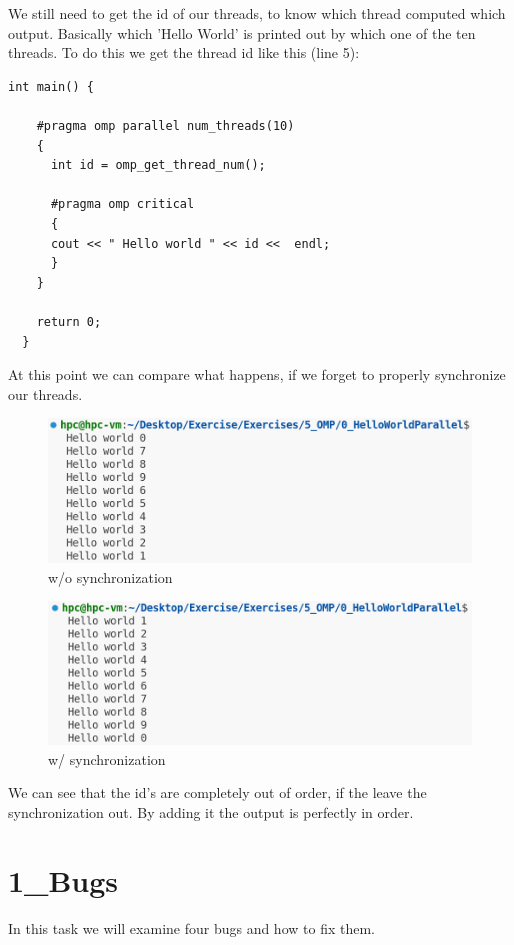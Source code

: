 \documentclass{article}
\begin{document}
We still need to get the id of our threads, to know which thread computed which output.
Basically which 'Hello World' is printed out by which one of the ten threads.
To do this we get the thread id like this (line 5):
\begin{lstlisting}[caption=Step 2]
    int main() {

    #pragma omp parallel num_threads(10)
    {
      int id = omp_get_thread_num();
      
      #pragma omp critical
      {
      cout << " Hello world " << id <<  endl;
      }
    }
  
    return 0;
  }
\end{lstlisting}
At this point we can compare what happens, if we forget to properly synchronize our threads.
\begin{figure}[H]
    \centering
    \includegraphics[scale=0.6]{no-critical.png} 
    \caption{w/o synchronization}
    \label{fig:graph}
\end{figure}
\begin{figure}[H]
    \centering
    \includegraphics[scale=0.6]{with-critical.png} 
    \caption{w/ synchronization}
    \label{fig:graph}
\end{figure}
We can see that the id's are completely out of order, if the leave the synchronization out.
By adding it the output is perfectly in order.
\section*{1\_Bugs}
In this task we will examine four bugs and how to fix them.
\end{document}
